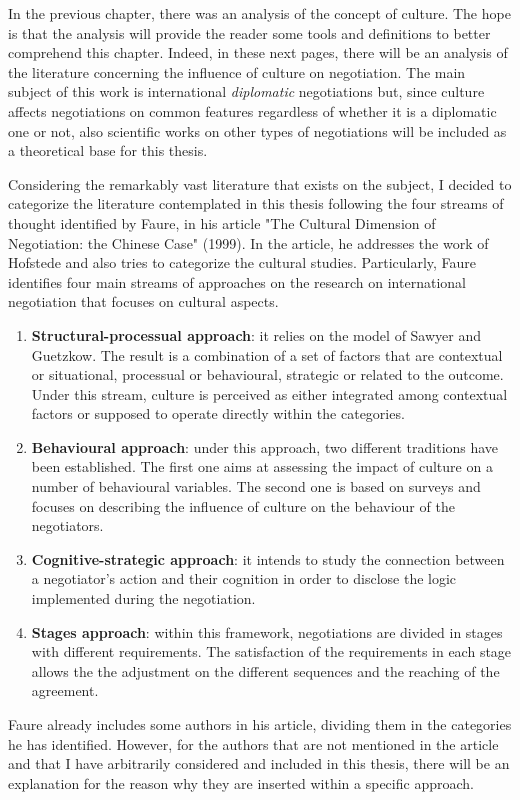 \documentclass[../main.tex]{subfiles}
\begin{document}
In the previous chapter, there was an analysis of the concept of culture. The hope is that the analysis will provide the reader some tools and definitions to better comprehend this chapter. Indeed, in these next pages, there will be an analysis of the literature concerning the influence of culture on negotiation. The main subject of this work is international \textit{diplomatic} negotiations but, since culture affects negotiations on common features regardless of whether it is a diplomatic one or not, also scientific works on other types of negotiations will be included as a theoretical base for this thesis.%

Considering the remarkably vast literature that exists on the subject, I decided to categorize the literature contemplated %
in this thesis following the four streams of thought identified by Faure, in his article "The Cultural Dimension of Negotiation: the Chinese Case" (1999). In the article, he addresses the work of Hofstede and also tries to categorize the cultural studies. Particularly, Faure identifies four main streams of approaches on the research on international negotiation that focuses on cultural aspects.
\begin{enumerate}
\item \textbf{Structural-processual approach}: it relies on the model of Sawyer and Guetzkow. The result is a combination of a set of factors that are contextual or situational, processual or behavioural, strategic or related to the outcome. Under this stream, culture is perceived as either integrated among contextual factors or supposed to operate directly within the categories.
\item \textbf{Behavioural approach}: under this approach, two different traditions have been established. The first one aims at assessing the impact of culture on a number of behavioural variables. The second one is based on surveys and focuses on describing the influence of culture on the behaviour of the negotiators.
\item \textbf{Cognitive-strategic approach}: it intends to study the connection between a negotiator's action and their cognition in order to disclose the logic implemented during the negotiation.
\item \textbf{Stages approach}: within this framework, negotiations are divided in stages with different requirements. The satisfaction of the requirements in each stage allows the the adjustment on the different sequences and the reaching of the agreement.
\end{enumerate} %

Faure already includes some authors in his article, dividing them in the categories he has identified. However, for the authors that are not mentioned in the article and that I have arbitrarily considered and included in this thesis, there will be an explanation for the reason why they are inserted within a specific approach.
\end{document}

